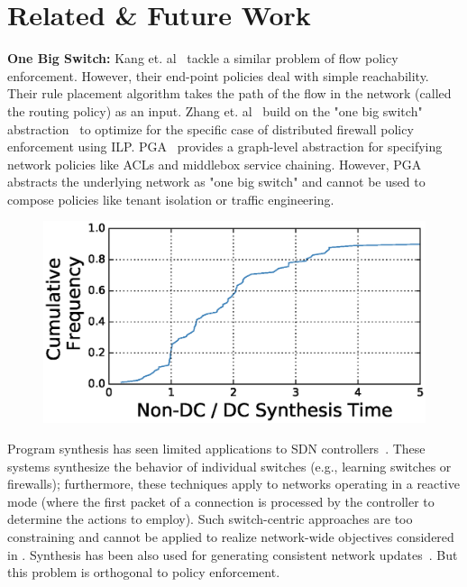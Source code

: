 \section{Related \& Future Work} \label{sec:relatedwork}
\textbf{One Big Switch:} Kang et. al~\cite{oneswitch} tackle a 
similar problem of flow policy
enforcement. However, their end-point policies deal with simple
reachability. Their rule placement algorithm takes the path of the
flow in the network (called the routing policy) as an input. %
Zhang et. al~\cite{distfirewall} build on the "one big switch"  
abstraction~\cite{oneswitch} to optimize for the specific case of
distributed firewall policy enforcement using ILP.  PGA~\cite{pga} provides
a graph-level abstraction for specifying network policies like ACLs and
middlebox service chaining. However, PGA abstracts the underlying
network as "one big switch" and cannot be used to compose policies like
tenant isolation or traffic engineering.
\begin{figure}[t]
	\centering
	\includegraphics[width=0.7\columnwidth]{figures/dcSynthesis.eps}
	\label{fig:dcsyn-cdf}
\end{figure}

 Program synthesis has
 seen limited applications to SDN controllers~\cite{netegg,decentralize}.
These systems synthesize the
 behavior of individual switches (e.g., learning switches or
 firewalls); furthermore, these techniques apply to networks
 operating in a reactive mode (where the first packet of a connection
 is processed by the controller to determine the actions to
 employ). Such switch-centric approaches are too constraining and
 cannot be applied to realize network-wide objectives considered 
 in \name.
 Synthesis has been also used for generating consistent network
 updates~\cite{updates, customconsistency}. But this problem is orthogonal to 
 policy enforcement.
 
